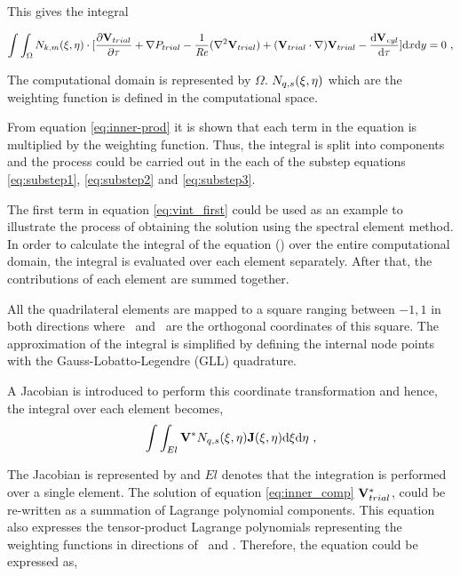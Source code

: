 This gives the integral 

 \begin{equation} \centering
 \label{eq:inner-prod}
 \int\int_{\Omega}N_{k,m}(\compone,\comptwo)\cdot[\pderiv{\Vtrial}{\tau} +\grad{\Ptrial} - \frac{1}{\Rey}(\gradsq{\Vtrial}) + (\Vtrial\cdot\nabla)\Vtrial - \accframe]\mathrm{d}x\mathrm{d}y = 0 ~,
 \end{equation}
 
The computational domain is represented by $\Omega$. $N_{q,s}(\xi,\eta)$ which are the weighting function is defined in the computational space.

From equation \ref{eq:inner-prod} it is shown that each term in the equation is multiplied by the weighting function. Thus, the integral is split into components and the process could be carried out in the each of the substep equations \ref{eq:substep1}, \ref{eq:substep2} and \ref{eq:substep3}. 



The first term in equation \ref{eq:vint_first} could be used as an example to illustrate the process of obtaining the solution using the spectral element method. In order to calculate the integral of the equation () over the entire computational domain, the integral is evaluated over each element separately. After that, the contributions of each element are summed together. 

All the quadrilateral elements are mapped to a square ranging between $-1,1$ in both directions where \compone\ and \comptwo\ are the orthogonal coordinates of this square. The approximation of the integral is simplified by defining the internal node points with the Gauss-Lobatto-Legendre (GLL) quadrature.

A Jacobian is introduced to perform this coordinate transformation and hence, the integral over each element becomes,
\begin{equation} \centering
\label{eq:inner_comp}
\int\int_{El}\Vint N_{q,s}(\compone,\comptwo)\jacobian(\compone, \comptwo)\mathrm{d}\compone \mathrm{d}\comptwo ~,
\end{equation}

The Jacobian is represented by \jacobian and $El$ denotes that the integration is performed over a single element. The solution of equation \ref{eq:inner_comp} $\mathbf{V}_{trial}^{*}$, could be re-written as a summation of Lagrange polynomial components. This equation also expresses the tensor-product Lagrange polynomials representing the weighting functions in directions of \compone\ and \comptwo. Therefore, the equation could be expressed as,    

